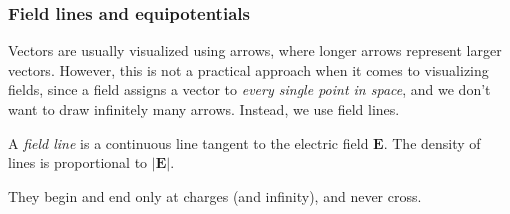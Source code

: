 \documentclass[a4paper]{article}
\begin{document}
\subsubsection{Field lines and equipotentials}
Vectors are usually visualized using arrows, where longer arrows represent larger vectors. However, this is not a practical approach when it comes to visualizing fields, since a field assigns a vector to \emph{every single point in space}, and we don't want to draw infinitely many arrows. Instead, we use field lines.

\begin{defi}
  A \emph{field line} is a continuous line tangent to the electric field $\mathbf{E}$. The density of lines is proportional to $|\mathbf{E}|$.
\end{defi}
They begin and end only at charges (and infinity), and never cross.
\end{document}
